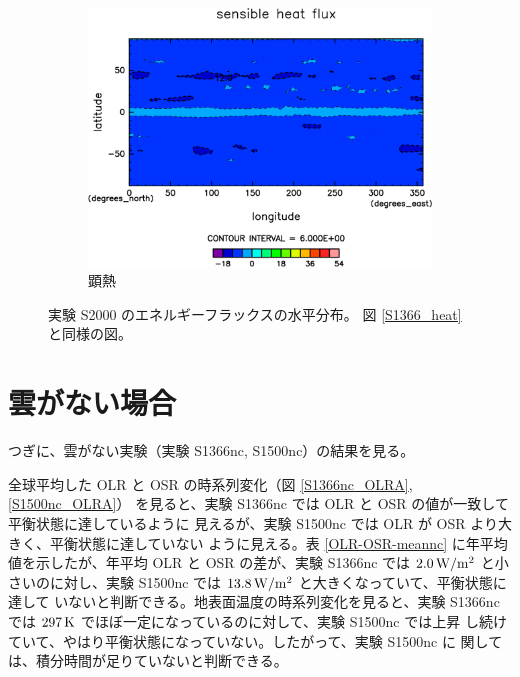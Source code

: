 \documentclass[body]{subfiles}
\begin{document}
\begin{figure}[t]
\begin{subfigure}{.4\textwidth}
		\includegraphics[width=\columnwidth]{S2000/Sens,time=7300:7665-crop-rotate.pdf}
		\caption{顕熱\hmu*{[W/m^{-2}]}}\label{S2000顕熱}
	\end{subfigure}
	\caption[実験 S2000 のエネルギーフラックスの水平分布]{
		実験 S2000 のエネルギーフラックスの水平分布。
		図 \ref{S1366_heat} と同様の図。
	}\label{S2000_heat}
\end{figure}

\section{雲がない場合}

つぎに、雲がない実験（実験 S1366nc, S1500nc）の結果を見る。

全球平均した OLR と OSR の時系列変化（図 \ref{S1366nc_OLRA}, \ref{S1500nc_OLRA}）
を見ると、実験 S1366nc では OLR と OSR の値が一致して平衡状態に達しているように
見えるが、実験 S1500nc では OLR が OSR より大きく、平衡状態に達していない
ように見える。表 \ref{OLR-OSR-meannc} に年平均値を示したが、年平均 OLR と
OSR の差が、実験 S1366nc では \(2.0\hmu{W/m^2}\) と小さいのに対し、実験
S1500nc では \(13.8\hmu{W/m^2}\) と大きくなっていて、平衡状態に達して
いないと判断できる。地表面温度の時系列変化を見ると、実験 S1366nc では
\(297\hmu{K}\) でほぼ一定になっているのに対して、実験 S1500nc では上昇
し続けていて、やはり平衡状態になっていない。したがって、実験 S1500nc に
関しては、積分時間が足りていないと判断できる。
\end{document}
